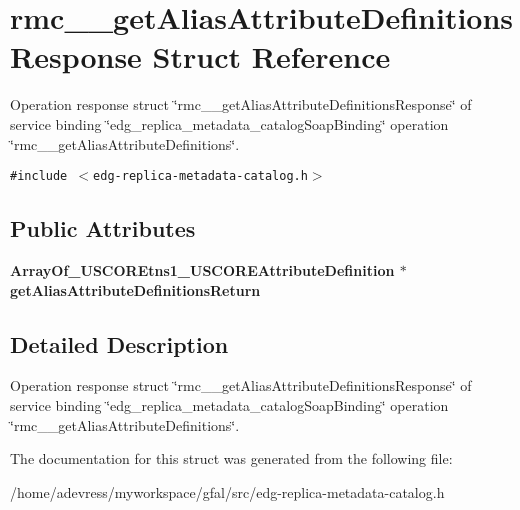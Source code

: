 \section{rmc\_\-\_\-get\-Alias\-Attribute\-Definitions\-Response Struct Reference}
\label{structrmc____getAliasAttributeDefinitionsResponse}
Operation response struct \char`\"{}rmc\_\-\_\-get\-Alias\-Attribute\-Definitions\-Response\char`\"{} of service binding \char`\"{}edg\_\-replica\_\-metadata\_\-catalog\-Soap\-Binding\char`\"{} operation \char`\"{}rmc\_\-\_\-get\-Alias\-Attribute\-Definitions\char`\"{}.  


{\tt \#include $<$edg-replica-metadata-catalog.h$>$}

\subsection*{Public Attributes}
\begin{CompactItemize}
\item 
\bf{Array\-Of\_\-USCOREtns1\_\-USCOREAttribute\-Definition} $\ast$ \textbf{get\-Alias\-Attribute\-Definitions\-Return}\label{structrmc____getAliasAttributeDefinitionsResponse_70a2dd4392019aa5cf8552d5a35fff98}

\end{CompactItemize}


\subsection{Detailed Description}
Operation response struct \char`\"{}rmc\_\-\_\-get\-Alias\-Attribute\-Definitions\-Response\char`\"{} of service binding \char`\"{}edg\_\-replica\_\-metadata\_\-catalog\-Soap\-Binding\char`\"{} operation \char`\"{}rmc\_\-\_\-get\-Alias\-Attribute\-Definitions\char`\"{}. 



The documentation for this struct was generated from the following file:\begin{CompactItemize}
\item 
/home/adevress/myworkspace/gfal/src/edg-replica-metadata-catalog.h\end{CompactItemize}

